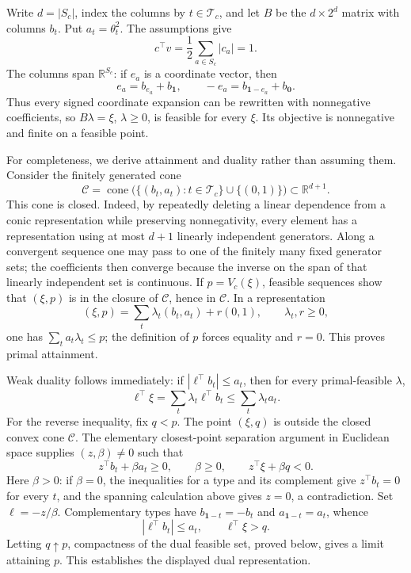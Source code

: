 Write \(d=|S_c|\), index the columns by \(t\in\mathcal T_c\), and let \(B\) be the \(d\times2^d\) matrix with columns \(b_t\).  Put \(a_t=\theta_t^2\).  The assumptions give
\[
c^\top v=\frac12\sum_{a\in S_c}|c_a|=1.
\]
The columns span \(\mathbb R^{S_c}\): if \(e_a\) is a coordinate vector, then
\[
e_a=b_{e_a}+b_{\mathbf1},\qquad -e_a=b_{\mathbf1-e_a}+b_{\mathbf0}.
\]
Thus every signed coordinate expansion can be rewritten with nonnegative coefficients, so \(B\lambda=\xi\), \(\lambda\ge0\), is feasible for every \(\xi\).  Its objective is nonnegative and finite on a feasible point.

For completeness, we derive attainment and duality rather than assuming them.  Consider the finitely generated cone
\[
\mathcal C=\operatorname{cone}\bigl(\{(b_t,a_t):t\in\mathcal T_c\}\cup\{(0,1)\}\bigr)
 \subset\mathbb R^{d+1}.
\]
This cone is closed.  Indeed, by repeatedly deleting a linear dependence from a conic representation while preserving nonnegativity, every element has a representation using at most \(d+1\) linearly independent generators.  Along a convergent sequence one may pass to one of the finitely many fixed generator sets; the coefficients then converge because the inverse on the span of that linearly independent set is continuous.  If \(p=V_c(\xi)\), feasible sequences show that \((\xi,p)\) is in the closure of \(\mathcal C\), hence in \(\mathcal C\).  In a representation
\[
(\xi,p)=\sum_t\lambda_t(b_t,a_t)+r(0,1),\qquad \lambda_t,r\ge0,
\]
one has \(\sum_ta_t\lambda_t\le p\); the definition of \(p\) forces equality and \(r=0\).  This proves primal attainment.

Weak duality follows immediately: if \(|\ell^\top b_t|\le a_t\), then for every primal-feasible \(\lambda\),
\[
\ell^\top\xi=\sum_t\lambda_t\ell^\top b_t
 \le \sum_t\lambda_ta_t.
\]
For the reverse inequality, fix \(q<p\).  The point \((\xi,q)\) is outside the closed convex cone \(\mathcal C\).  The elementary closest-point separation argument in Euclidean space supplies \((z,\beta)\ne0\) such that
\[
z^\top b_t+\beta a_t\ge0,\qquad \beta\ge0,\qquad
z^\top\xi+\beta q<0.
\]
Here \(\beta>0\): if \(\beta=0\), the inequalities for a type and its complement give \(z^\top b_t=0\) for every \(t\), and the spanning calculation above gives \(z=0\), a contradiction.  Set \(\ell=-z/\beta\).  Complementary types have \(b_{\mathbf1-t}=-b_t\) and \(a_{\mathbf1-t}=a_t\), whence
\[
|\ell^\top b_t|\le a_t,\qquad \ell^\top\xi>q.
\]
Letting \(q\uparrow p\), compactness of the dual feasible set, proved below, gives a limit attaining \(p\).  This establishes the displayed dual representation.


